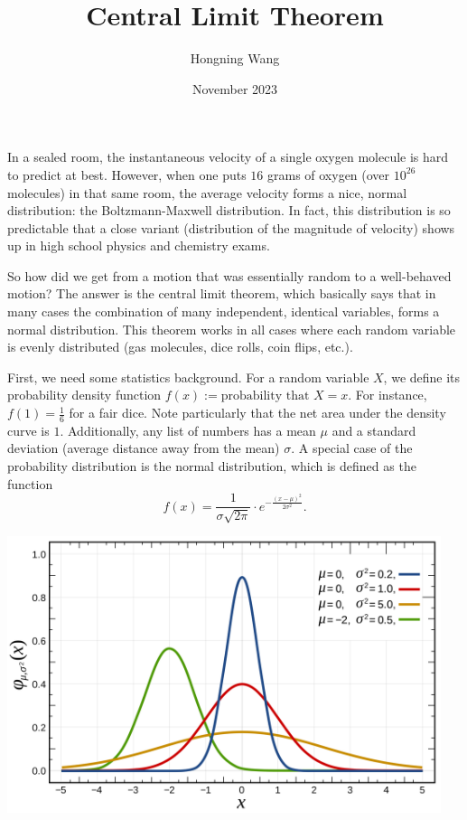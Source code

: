 \documentclass{article}
\title{Central Limit Theorem}
\author{Hongning Wang}
\date{November 2023}
\begin{document}
\maketitle

In a sealed room, the instantaneous velocity of a single oxygen molecule is hard to predict at best. However, when one puts $16$ grams of oxygen (over $10^{26}$ molecules) in that same room, the average velocity forms a nice, normal distribution: the Boltzmann-Maxwell distribution. In fact, this distribution is so predictable that a close  variant (distribution of the magnitude of velocity) shows up in high school physics and chemistry exams.

So how did we get from a motion that was essentially random to a well-behaved motion? The answer is the central limit theorem, which basically says that in many cases the combination of many independent, identical variables, forms a normal distribution. This theorem works in all cases where each random variable is evenly distributed (gas molecules, dice rolls, coin flips, etc.).

First, we need some statistics background. For a random variable $X$, we define its probability density function $f(x) := \text{probability that } X = x$. For instance, $f(1) = \frac{1}{6}$ for a fair dice. Note particularly that the net area under the density curve is $1$. Additionally, any list of numbers has a mean $\mu$ and a standard deviation (average distance away from the mean) $\sigma$. A special case of the probability distribution is the normal distribution, which is defined as the function
\[ f(x) = \frac{1}{\sigma \sqrt{2\pi}} \cdot e^{-\frac{(x - \mu)^2}{2\sigma^2}}. \]

\begin{center}
    \includegraphics[width=5in, scale=0.1]{images/normal_distrib.png}
\end{center}
\end{document}
